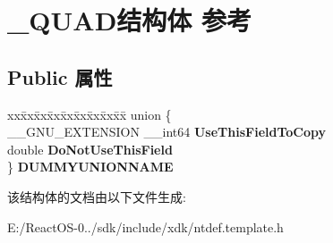 \hypertarget{struct___q_u_a_d}{}\section{\+\_\+\+Q\+U\+A\+D结构体 参考}
\label{struct___q_u_a_d}
\subsection*{Public 属性}
\begin{DoxyCompactItemize}
\item 
\mbox{\label{struct___q_u_a_d_ab5a504171e6fee06e07f2db97a288f6b}} 
\begin{tabbing}
xx\=xx\=xx\=xx\=xx\=xx\=xx\=xx\=xx\=\kill
union \{\\
\>\_\_GNU\_EXTENSION \_\_int64 {\bfseries UseThisFieldToCopy}\\
\>double {\bfseries DoNotUseThisField}\\
\} {\bfseries DUMMYUNIONNAME}\\

\end{tabbing}\end{DoxyCompactItemize}


该结构体的文档由以下文件生成\+:\begin{DoxyCompactItemize}
\item 
E\+:/\+React\+O\+S-\/0../sdk/include/xdk/ntdef.\+template.\+h\end{DoxyCompactItemize}
